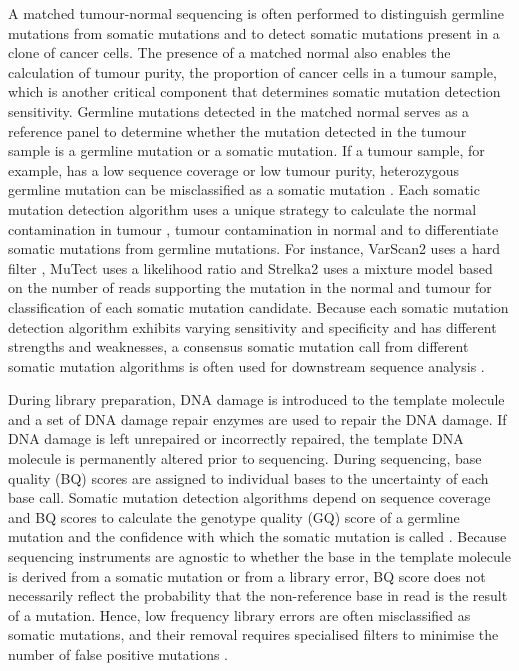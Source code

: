 A matched tumour-normal sequencing is often performed to distinguish germline mutations from somatic mutations and to detect somatic mutations present in a clone of cancer cells. The presence of a matched normal also enables the calculation of tumour purity, the proportion of cancer cells in a tumour sample, which is another critical component that determines somatic mutation detection sensitivity.  Germline mutations detected in the matched normal serves as a reference panel to determine whether the mutation detected in the tumour sample is a germline mutation or a somatic mutation. If a tumour sample, for example, has a low sequence coverage or low tumour purity, heterozygous germline mutation can be misclassified as a somatic mutation \cite{Cibulskis2013-gw}. Each somatic mutation detection algorithm uses a unique strategy to calculate the normal contamination in tumour \cite{Cibulskis2011-tp}, tumour contamination in normal \cite{Taylor-Weiner2018-af} and to differentiate somatic mutations from germline mutations. For instance, VarScan2 uses a hard filter \cite{Koboldt2012-wd}, MuTect uses a likelihood ratio \cite{Cibulskis2013-gw} and Strelka2 uses a mixture model \cite{Kim2018-qi} based on the number of reads supporting the mutation in the normal and tumour for classification of each somatic mutation candidate. Because each somatic mutation detection algorithm exhibits varying sensitivity and specificity and has different strengths and weaknesses, a consensus somatic mutation call from different somatic mutation algorithms is often used for downstream sequence analysis \cite{Bailey2020-ou}.

During library preparation, DNA damage is introduced to the template molecule and a set of DNA damage repair enzymes are used to repair the DNA damage. If DNA damage is left unrepaired or incorrectly repaired, the template DNA molecule is permanently altered prior to sequencing. During sequencing, base quality (BQ) scores are assigned to individual bases to the uncertainty of each base call. Somatic mutation detection algorithms depend on sequence coverage and BQ scores to calculate the genotype quality (GQ) score of a germline mutation \cite{McKenna2010-br, Li2011-ag} and the confidence with which the somatic mutation is called \cite{Cibulskis2013-gw}. Because sequencing instruments are agnostic to whether the base in the template molecule is derived from a somatic mutation or from a library error, BQ score does not necessarily reflect the probability that the non-reference base in read is the result of a mutation. Hence, low frequency library errors are often misclassified as somatic mutations, and their removal requires specialised filters to minimise the number of false positive mutations \cite{Costello2013-cz, Chen2017-ba}. 

